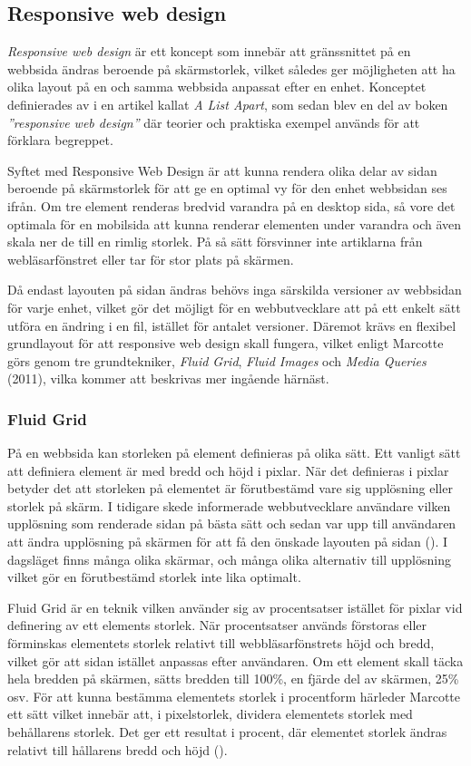 \documentclass[11pt]{article}
\begin{document}
\subsection{Responsive web design}
\textit{Responsive web design} är ett koncept som innebär att gränssnittet på en webbsida ändras beroende på skärmstorlek, vilket således ger möjligheten att ha olika layout på en och samma webbsida anpassat efter en enhet. Konceptet definierades av \cite{resp} i en artikel kallat \textit{A List Apart}, som sedan blev en del av boken \textit{”responsive web design”} där teorier och praktiska exempel används för att förklara begreppet. 

Syftet med Responsive Web Design är att kunna rendera olika delar av sidan beroende på skärmstorlek för att ge en optimal vy för den enhet webbsidan ses ifrån. Om tre element renderas bredvid varandra på en desktop sida, så vore det optimala för en mobilsida att kunna renderar elementen under varandra och även skala ner de till en rimlig storlek. På så sätt försvinner inte artiklarna från webläsarfönstret eller tar för stor plats på skärmen.

Då endast layouten på sidan ändras behövs inga särskilda versioner av webbsidan för varje enhet, vilket gör det möjligt för en webbutvecklare att på ett enkelt sätt utföra en ändring i en fil, istället för antalet versioner. Däremot krävs en flexibel grundlayout för att responsive web design skall fungera, vilket enligt Marcotte görs genom tre grundtekniker, \textit{Fluid Grid}, \textit{Fluid Images} och \textit{Media Queries} (2011), vilka kommer att beskrivas mer ingående härnäst.

\subsubsection{Fluid Grid}
På en webbsida kan storleken på element definieras på olika sätt. Ett vanligt sätt att definiera element är med bredd och höjd i pixlar. När det definieras i pixlar betyder det att storleken på elementet är förutbestämd vare sig upplösning eller storlek på skärm. I tidigare skede informerade webbutvecklare användare vilken upplösning som renderade sidan på bästa sätt och sedan var upp till användaren att ändra upplösning på skärmen för att få den önskade layouten på sidan (\cite[s. 6]{resp}). I dagsläget finns många olika skärmar, och många olika alternativ till upplösning vilket gör en förutbestämd storlek inte lika optimalt. 

Fluid Grid är en teknik vilken använder sig av procentsatser istället för pixlar vid definering av ett elements storlek. När procentsatser används förstoras eller förminskas elementets storlek relativt till webbläsarfönstrets höjd och bredd, vilket gör att sidan istället anpassas efter användaren. Om ett element skall täcka hela bredden på skärmen, sätts bredden till 100\%, en fjärde del av skärmen, 25\% osv. 
För att kunna bestämma elementets storlek i procentform härleder Marcotte ett sätt vilket innebär att, i pixelstorlek, dividera elementets storlek med behållarens storlek. Det ger ett resultat i procent, där elementet storlek ändras relativt till hållarens bredd och höjd (\cite[s. 23]{resp}).
\end{document}
